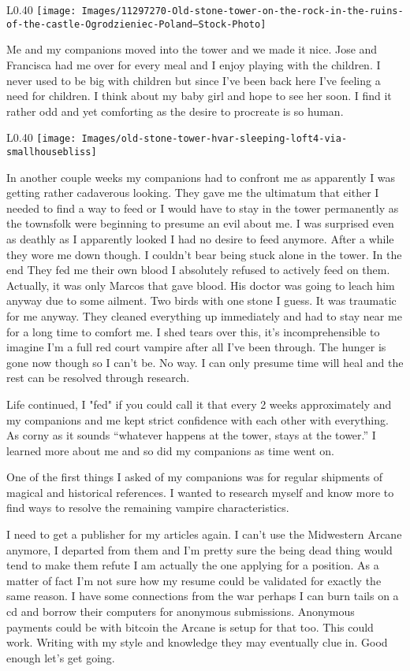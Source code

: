 \begin{wrapfigure}{L}{0.40\textwidth}
	\centering
	\texttt{[image: Images/11297270-Old-stone-tower-on-the-rock-in-the-ruins-of-the-castle-Ogrodzieniec-Poland--Stock-Photo]}
\end{wrapfigure}
Me and my companions moved into the tower and we made it nice. Jose and Francisca had me over for every meal and I enjoy playing with the children. I never used to be big with children but since I've been back here I've feeling a need for children. I think about my baby girl and hope to see her soon. I find it rather odd and yet comforting as the desire to procreate is so human.
\begin{wrapfigure}{L}{0.40\textwidth}
	\centering
	\texttt{[image: Images/old-stone-tower-hvar-sleeping-loft4-via-smallhousebliss]}
\end{wrapfigure}
In another couple weeks my companions had to confront me as apparently I was getting rather cadaverous looking. They gave me the ultimatum that either I needed to find a way to feed or I would have to stay in the tower permanently as the townsfolk were beginning to presume an evil about me. I was surprised even as deathly as I apparently looked I had no desire to feed anymore. After a while they wore me down though. I couldn't bear being stuck alone in the tower. In the end They fed me their own blood I absolutely refused to actively feed on them. Actually, it was only Marcos that gave blood. His doctor was going to leach him anyway due to some ailment. Two birds with one stone I guess. It was traumatic for me anyway. They cleaned everything up immediately and had to stay near me for a long time to comfort me. I shed tears over this, it's incomprehensible to imagine I'm a full red court vampire after all I've been through. The hunger is gone now though so I can't be. No way. I can only presume time will heal and the rest can be resolved through research.

Life continued, I "fed" if you could call it that every 2 weeks approximately and my companions and me kept strict confidence with each other with everything. As corny as it sounds ``whatever happens at the tower, stays at the tower.'' I learned more about me and so did my companions as time went on.

One of the first things I asked of my companions was for regular shipments of magical and historical references. I wanted to research myself and know more to find ways to resolve the remaining vampire characteristics.

I need to get a publisher for my articles again. I can't use the Midwestern Arcane anymore, I departed from them and I'm pretty sure the being dead thing would tend to make them refute I am actually the one applying for a position. As a matter of fact I'm not sure how my resume could be validated for exactly the same reason. I have some connections from the war perhaps I can burn tails on a cd and borrow their computers for anonymous submissions. Anonymous payments could be with bitcoin the Arcane is setup for that too. This could work. Writing with my style and knowledge they may eventually clue in. Good enough let's get going.

